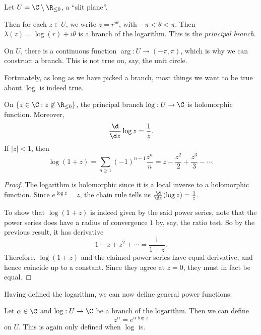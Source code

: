 \documentclass[a4paper]{article}
\begin{document}
\begin{eg}
  Let $U = \C\setminus \R_{\leq 0}$, a ``slit plane''.
  \begin{center}
  \end{center}
  Then for each $z \in U$, we write $z = r^{i \theta}$, with $-\pi < \theta < \pi$. Then $\lambda(z) = \log (r) + i \theta$ is a branch of the logarithm. This is the \emph{principal branch}.

  On $U$, there is a continuous function $\arg: U \to (-\pi, \pi)$, which is why we can construct a branch. This is not true on, say, the unit circle.
\end{eg}

Fortunately, as long as we have picked a branch, most things we want to be true about $\log$ is indeed true.
\begin{prop}
  On $\{z \in \C: z \not\in \R_{\leq 0}\}$, the principal branch $\log: U \to \C$ is holomorphic function. Moreover,
  \[
    \frac{\d}{\d z}\log z = \frac{1}{z}.
  \]
  If $|z| < 1$, then
  \[
    \log (1 + z) = \sum_{n \geq 1} (-1)^{n - 1} \frac{z^n}{n} = z - \frac{z^2}{2} + \frac{z^3}{3} - \cdots.
  \]
\end{prop}

\begin{proof}
  The logarithm is holomorphic since it is a local inverse to a holomorphic function. Since $e^{\log z} = z$, the chain rule tells us $\frac{\d}{\d z} (\log z) = \frac{1}{z}$.

  To show that $\log(1 + z)$ is indeed given by the said power series, note that the power series does have a radius of convergence $1$ by, say, the ratio test. So by the previous result, it has derivative
  \[
    1 - z + z^2 + \cdots = \frac{1}{1 + z}.
  \]
  Therefore, $\log(1 + z)$ and the claimed power series have equal derivative, and hence coincide up to a constant. Since they agree at $z = 0$, they must in fact be equal.
\end{proof}
Having defined the logarithm, we can now define general power functions.

Let $\alpha \in \C$ and $\log: U \to \C$ be a branch of the logarithm. Then we can define
\[
  z^{\alpha} = e^{\alpha \log z}
\]
on $U$. This is again only defined when $\log$ is.
\end{document}
